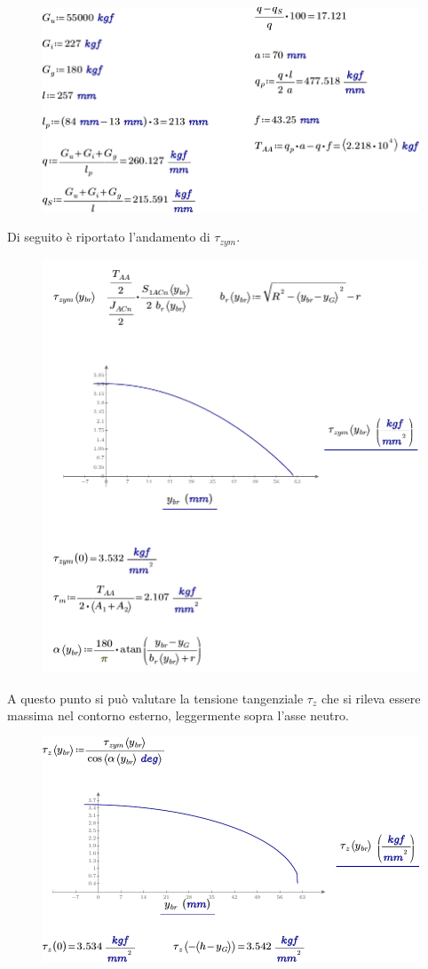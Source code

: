 \begin{figure}[H]
\centering
  \includegraphics[width=.65\textwidth]{imgs/MathAsse4}
\caption{}
\label{fig:MathAsse4}
\end{figure}
Di seguito è riportato l'andamento di $\tau_{zym}$.
\begin{figure}[H]
\centering
  \includegraphics[width=.65\textwidth]{imgs/MathAsse4_1}
\caption{}
\label{fig:MathAsse4_1}
\end{figure}
A questo punto si può valutare la tensione tangenziale $\tau_z$ che si rileva essere massima nel contorno esterno, leggermente sopra l'asse neutro. 
\begin{figure}[H]
\centering
  \includegraphics[width=.65\textwidth]{imgs/MathAsse4_2}
\caption{}
\label{fig:MathAsse4_2}
\end{figure}


